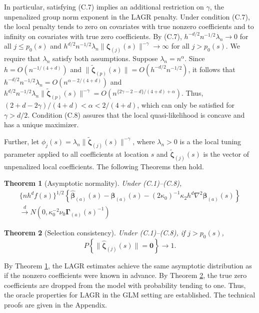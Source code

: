 \documentclass[authoryear,review, 12pt]{elsarticle}
\newtheorem{thm}{Theorem}
\begin{document}
In particular, satisfying (C.7) implies an additional restriction
on $\gamma$, the unpenalized group norm exponent in the LAGR penalty.
Under condition (C.7), the local penalty tends to zero on covariates
with true nonzero coefficients and to infinity on covariates with
true zero coefficients. By (C.7), $h^{-d/2}n^{-1/2}\lambda_{n}\to0$
for all $j\le p_{0}(s)$ and $h^{d/2}n^{-1/2}\lambda_{n}\|\bm{\zeta}_{(j)}(s)\|^{-\gamma}\to\infty$
for all $j>p_{0}(s)$. We require that $\lambda_{n}$ satisfy both assumptions.
Suppose $\lambda_{n}=n^{\alpha}$. Since $h=O\left(n^{-1/(4+d)}\right)$
and $\|\tilde{\bm{\zeta}}_{(p)}(s)\|=O\left(h^{-d/2}n^{-1/2}\right)$,
it follows that $h^{-d/2}n^{-1/2}\lambda_{n}=O\left(n^{\alpha - 2/(4+d)}\right)$
and $h^{d/2} n^{-1/2}\lambda_{n}\|\tilde{\bm{\zeta}}_{(p)}(s)\|^{-\gamma}=O\left(n^{ \{2\gamma - 2 - d\}/(4+d) + \alpha}\right)$.
Thus, $(2 + d - 2\gamma) / (4+d) < \alpha < 2 / (4+d)$, which can only be satisfied
for $\gamma > d/2$. Condition (C.8) assures that the local quasi-likelihood
is concave and has a unique maximizer.

Further, let $\phi_{j}(s)=\lambda_{n}\|\tilde{\bm{\zeta}}_{(j)}(s)\|^{-\gamma}$,
where $\lambda_{n}>0$ is a the local tuning parameter applied to
all coefficients at location $s$ and $\tilde{\bm{\zeta}}_{(j)}(s)$
is the vector of unpenalized local coefficients. The following Theorems then hold.

\begin{thm}[Asymptotic normality]
\label{theorem:normality-glm}  Under (C.1)--(C.8),
\begin{gather*}
\{ n h^d f(s)\}^{1/2} \left\{ \hat{\bm{\beta}}_{(a)}(s) - \bm{\beta}_{(a)}(s) - (2 \kappa_0)^{-1} \kappa_2 h^d \nabla^2 \bm{\beta}_{(a)}(s) \right\} \\
\xrightarrow{d}N\left(0,\kappa_{0}^{-2}\nu_{0}\bm{\Gamma}_{(a)}(s)^{-1}\right)
\end{gather*}
\end{thm}

\begin{thm}[Selection consistency]
\label{theorem:selection-glm}  Under (C.1)--(C.8), if $j>p_{0}(s)$,
\[
P\left\{ \|\hat{\bm{\zeta}}_{(j)}(s)\|=\bm{0}\right\} \to1.
\]
 
\end{thm}
By Theorem \ref{theorem:normality-glm}, the LAGR estimates achieve
the same asymptotic distribution as if the nonzero coefficients were
known in advance. By Theorem \ref{theorem:selection-glm},
the true zero coefficients are dropped from the model with
probability tending to one. Thus, the oracle properties for LAGR in the GLM
setting are established. The technical proofs are given in the Appendix.
\end{document}
